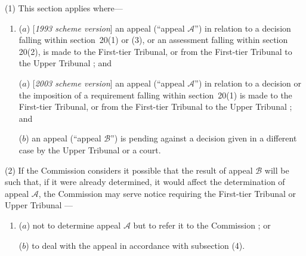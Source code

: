 \documentclass[12pt,a4paper]{article}
\begin{document}
(1) This section applies where—
\begin{enumerate}\item[]
($a$) [\emph{1993 scheme version}] an appeal (“appeal $\mathcal{A}$”) in relation to a decision falling within section~20(1) or (3), or an assessment falling within section 20(2), is made to 
the First-tier Tribunal, or from the First-tier Tribunal to the Upper Tribunal%
; and

($a$) [\emph{2003 scheme version}] an appeal (“appeal $\mathcal{A}$”) in relation to a decision or the imposition of a requirement falling within section~20(1)  is made to 
the First-tier Tribunal, or from the First-tier Tribunal to the Upper Tribunal%
;
and

($b$) an appeal (“appeal $\mathcal{B}$”) is pending against a decision given in a different case by 
the Upper Tribunal  %
or a court.
\end{enumerate}

(2) If the 
Commission  %
considers it possible that the result of appeal $\mathcal{B}$ will be such that, if it were already determined, it would affect the determination of appeal $\mathcal{A}$, 
the Commission  %
may serve notice requiring the 
First-tier Tribunal or Upper Tribunal%
—
\begin{enumerate}\item[]
($a$) not to determine appeal $\mathcal{A}$ but to refer it to 
the Commission%
; or

($b$) to deal with the appeal in accordance with subsection (4).
\end{enumerate}
\end{document}
